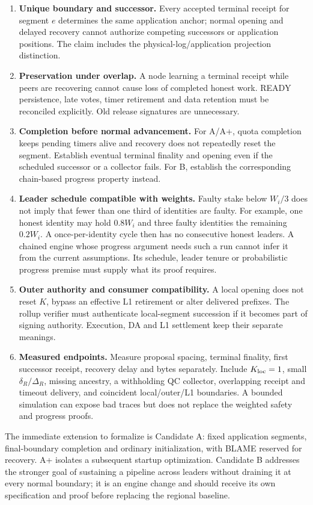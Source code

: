 \begin{enumerate}[label=\textbf{P\arabic*.}]
\item \textbf{Unique boundary and successor.} Every accepted terminal
receipt for segment $e$ determines the same application anchor; normal
opening and delayed recovery cannot authorize competing successors or
application positions. The claim includes the physical-log/application
projection distinction.
\item \textbf{Preservation under overlap.} A node learning a terminal
receipt while peers are recovering cannot cause loss of completed honest
work. READY persistence, late votes, timer retirement and data retention
must be reconciled explicitly. Old release signatures are unnecessary.
\item \textbf{Completion before normal advancement.} For A/A+, quota
completion keeps pending timers alive and recovery does not repeatedly
reset the segment. Establish eventual terminal finality and opening even
if the scheduled successor or a collector fails. For B, establish the
corresponding chain-based progress property instead.
\item \textbf{Leader schedule compatible with weights.} Faulty stake below
$W_i/3$ does not imply that fewer than one third of identities are faulty.
For example, one honest identity may hold $0.8W_i$ and three faulty identities
the remaining $0.2W_i$. A once-per-identity cycle then has no consecutive
honest leaders. A chained engine whose progress argument needs such a run
cannot infer it from the current assumptions. Its schedule, leader tenure
or probabilistic progress premise must supply what its proof requires.
\item \textbf{Outer authority and consumer compatibility.} A local opening
does not reset $K$, bypass an effective L1 retirement or alter delivered
prefixes. The rollup verifier must authenticate local-segment succession if
it becomes part of signing authority. Execution, DA and L1 settlement keep
their separate meanings.
\item \textbf{Measured endpoints.} Measure proposal spacing, terminal
finality, first successor receipt, recovery delay and bytes separately.
Include $K_{\rm loc}=1$, small $\delta_R/\Delta_R$, missing ancestry, a
withholding QC collector, overlapping receipt and timeout delivery, and
coincident local/outer/L1 boundaries. A bounded simulation can expose bad
traces but does not replace the weighted safety and progress proofs.
\end{enumerate}

The immediate extension to formalize is Candidate A: fixed application
segments, final-boundary completion and ordinary initialization, with
BLAME reserved for recovery. A+ isolates a subsequent startup optimization.
Candidate B addresses the stronger goal of sustaining a pipeline across
leaders without draining it at every normal boundary; it is an engine
change and should receive its own specification and proof before replacing
the regional baseline.
